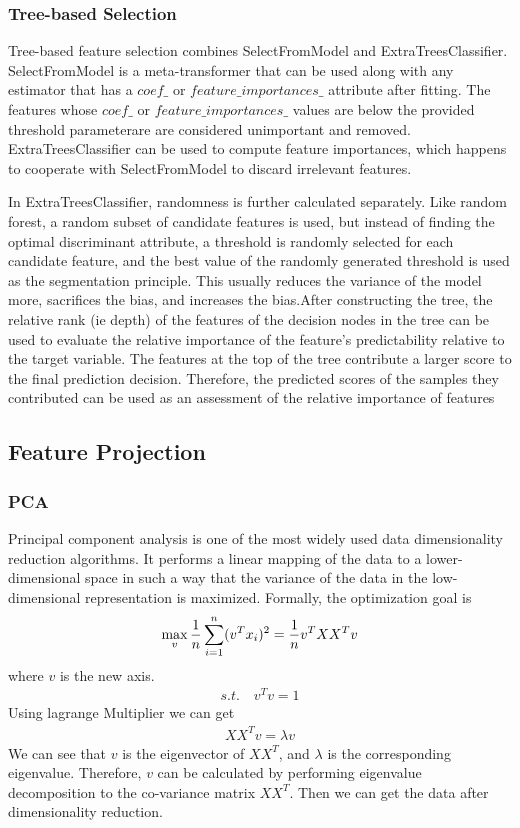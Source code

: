 \documentclass{article}
\begin{document}
\subsubsection{Tree-based Selection}
\indent Tree-based feature selection combines SelectFromModel and ExtraTreesClassifier. SelectFromModel is a meta-transformer that can be used along with any estimator that has a $coef\_$ or $feature\_importances\_$ attribute after fitting. The features whose $coef\_$ or $feature\_importances\_$ values are below the provided threshold parameterare are considered unimportant and removed. ExtraTreesClassifier can be used to compute feature importances, which happens to cooperate with SelectFromModel to discard irrelevant features.\par
\indent In ExtraTreesClassifier, randomness is further calculated separately. Like random forest, a random subset of candidate features is used, but instead of finding the optimal discriminant attribute, a threshold is randomly selected for each candidate feature, and the best value of the randomly generated threshold is used as the segmentation principle. This usually reduces the variance of the model more, sacrifices the bias, and increases the bias.After constructing the tree, the relative rank (ie depth) of the features of the decision nodes in the tree can be used to evaluate the relative importance of the feature's predictability relative to the target variable. The features at the top of the tree contribute a larger score to the final prediction decision. Therefore, the predicted scores of the samples they contributed can be used as an assessment of the relative importance of features

\subsection{Feature Projection}
\subsubsection{PCA}
\indent Principal component analysis is one of the most widely used data dimensionality reduction algorithms. It performs a linear mapping of the data to a lower-dimensional space in such a way that the variance of the data in the low-dimensional representation is maximized.\cite{pearson1901liii}
Formally, the optimization goal is
\begin{eqnarray}
\centering
\max_v \frac{1}{n}\sum_{i=1}^{n}(v^Tx_i)^2=\frac{1}{n}v^TXX^Tv
\end{eqnarray}
where $v$ is the new axis.
\begin{eqnarray}
s.t.\quad v^Tv=1
\end{eqnarray}
Using lagrange Multiplier we can get
\begin{eqnarray}
XX^Tv=\lambda v
\end{eqnarray}
We can see that $v$ is the eigenvector of $XX^T$, and $\lambda$ is the corresponding eigenvalue. Therefore, $v$ can be calculated by performing eigenvalue decomposition to the co-variance matrix $XX^T$. Then we can get the data after dimensionality reduction.
\end{document}
